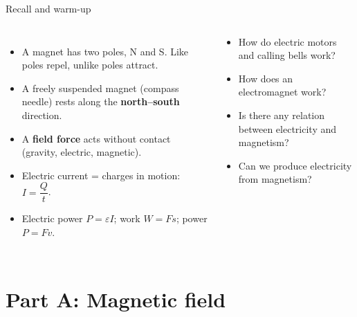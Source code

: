\documentclass[aspectratio=169,10pt,xcolor=table]{beamer}
\begin{document}
\begin{frame}{Recall and warm-up}
\begin{columns}[c]
\begin{itemize}
\item A magnet has two poles, N and S. Like poles repel, unlike poles attract.
\item A freely suspended magnet (compass needle) rests along the \textbf{north--south} direction.
\item A \textbf{field force} acts without contact (gravity, electric, magnetic).
\item Electric current = charges in motion: $I=\dfrac{Q}{t}$.
\item Electric power $P=\varepsilon I$; work $W=Fs$; power $P=Fv$.
\end{itemize}
\begin{think}
\small
\begin{itemize}
\item How do electric motors and calling bells work?
\item How does an electromagnet work?
\item Is there any relation between electricity and magnetism?
\item Can we produce electricity from magnetism?
\end{itemize}
\end{think}
\end{columns}
\end{frame}

\section{Part A: Magnetic field}
\end{document}
